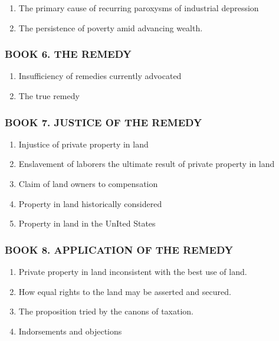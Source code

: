 \begin{enumerate}
\def\labelenumi{\arabic{enumi}.}
\tightlist
\item
  The primary cause of recurring paroxysms of industrial depression
\item
  The persistence of poverty amid advancing wealth.
\end{enumerate}

\hypertarget{book-6.-the-remedy}{%
\subsubsection{BOOK 6. THE REMEDY}\label{book-6.-the-remedy}}

\begin{enumerate}
\def\labelenumi{\arabic{enumi}.}
\tightlist
\item
  Insufficiency of remedies currently advocated
\item
  The true remedy
\end{enumerate}

\hypertarget{book-7.-justice-of-the-remedy}{%
\subsubsection{BOOK 7. JUSTICE OF THE
REMEDY}\label{book-7.-justice-of-the-remedy}}

\begin{enumerate}
\def\labelenumi{\arabic{enumi}.}
\tightlist
\item
  Injustice of private property in land
\item
  Enslavement of laborers the ultimate result of private property in
  land
\item
  Claim of land owners to compensation
\item
  Property in land historically considered
\item
  Property in land in the UnIted States
\end{enumerate}

\hypertarget{book-8.-application-of-the-remedy}{%
\subsubsection{BOOK 8. APPLICATION OF THE
REMEDY}\label{book-8.-application-of-the-remedy}}

\begin{enumerate}
\def\labelenumi{\arabic{enumi}.}
\tightlist
\item
  Private property in land inconsistent with the best use of land.
\item
  How equal rights to the land may be asserted and secured.
\item
  The proposition tried by the canons of taxation.
\item
  Indorsements and objections
\end{enumerate}

